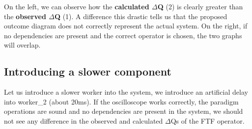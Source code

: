     On the left, we can observe how the \textbf{calculated $\Delta$Q} (2) is clearly greater than the \textbf{observed $\Delta$Q} (1). A difference this drastic tells us that the proposed outcome diagram does not correctly represent the actual system. On the right, if no dependencies are present and the correct operator is chosen, the two graphs will overlap.

    \subsection{Introducing a slower component}
        Let us introduce a slower worker into the system, we introduce an artificial delay into worker\_2 (about 20ms). If the oscilloscope works correctly, the paradigm operations are sound and no dependencies are present in the system, we should not see any difference in the observed and calculated $\Delta$Qs of the FTF operator.

